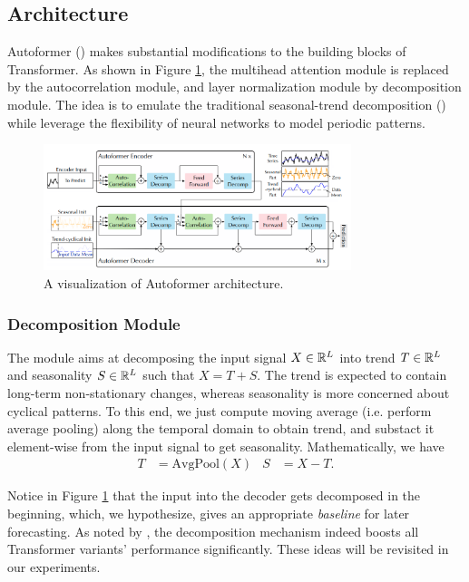 \subsection{Architecture}
Autoformer (\citet{https://doi.org/10.48550/arxiv.2106.13008}) makes substantial modifications to the building blocks of Transformer. 
As shown in Figure \ref{fig:autoformer}, the multihead attention module is replaced by the autocorrelation module, and layer normalization module by decomposition module. 
The idea is to emulate the traditional seasonal-trend decomposition (\citet{cleveland90}) while leverage the flexibility of neural networks to model periodic patterns. 

\begin{figure}
    \centering
    \includegraphics[width=0.8\textwidth]{img/autoformer.png}
    \caption{A visualization of Autoformer architecture.}
    \label{fig:autoformer}
\end{figure}

\subsubsection{Decomposition Module}
The module aims at decomposing the input signal $X \in \mathbb{R}^L$ into trend $T \in \mathbb{R}^L$ and seasonality $S \in \mathbb{R}^L$ such that $X = T + S$. 
The trend is expected to contain long-term non-stationary changes, whereas seasonality is more concerned about cyclical patterns. 
To this end, we just compute moving average (i.e. perform average pooling) along the temporal domain to obtain trend, and substact it element-wise from the input signal to get seasonality. 
Mathematically, we have \begin{align*}
    T &= \text{AvgPool}(X) & S &= X - T.
\end{align*}

Notice in Figure \ref{fig:autoformer} that the input into the decoder gets decomposed in the beginning, which, we hypothesize, gives an appropriate \textit{baseline} for later forecasting. 
As noted by \citet{https://doi.org/10.48550/arxiv.2202.07125}, the decomposition mechanism indeed boosts all Transformer variants' performance significantly. 
These ideas will be revisited in our experiments. 

